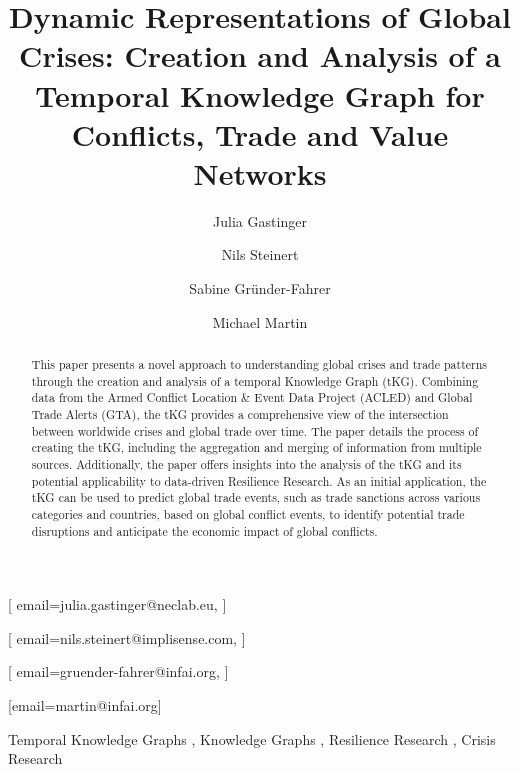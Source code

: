 \documentclass[
]{ceurart}
\begin{document}


\title{Dynamic Representations of Global Crises: Creation and Analysis of a Temporal Knowledge Graph for Conflicts, Trade and Value Networks}

\author[1,2]{Julia Gastinger}[
email=julia.gastinger@neclab.eu,
]
\cormark[1]
\address[1]{NEC Laboratories Europe GmbH, Kurfuersten-Anlage 36, 69115 Heidelberg, Germany}
\address[2]{University of Mannheim, Data and Web Science Group, B 6, 26, 68159 Mannheim, Germany}

\author[3]{Nils Steinert}[
email=nils.steinert@implisense.com,
]
\address[3]{Implisense GmbH, Spiekermannstraße 31a, 13189 Berlin, Germany}

\author[4]{Sabine Gründer-Fahrer}[
email=gruender-fahrer@infai.org,
]
\author[4]{Michael Martin}[email=martin@infai.org]
\address[4]{Institute for Applied Informatics (InfAI), Goerdelerring 9, 04109 Leipzig, Germany}


\begin{abstract}
This paper presents a novel approach to understanding global crises and trade patterns through the creation and analysis of a temporal Knowledge Graph (tKG). Combining data from the Armed Conflict Location \& Event Data Project (ACLED) and Global Trade Alerts (GTA), the tKG provides a comprehensive view of the intersection between worldwide crises and global trade over time. The paper details the process of creating the tKG, including the aggregation and merging of information from multiple sources. 
Additionally, the paper offers insights into the analysis of the tKG and its potential applicability to data-driven Resilience Research. As an initial application, the tKG can be used to predict global trade events, such as trade sanctions across various categories and countries, based on global conflict events, to identify potential trade disruptions and anticipate the economic impact of global conflicts.
\end{abstract}

\begin{keywords}
  Temporal Knowledge Graphs \sep
  Knowledge Graphs \sep
  Resilience Research \sep
  Crisis Research
\end{keywords}
\end{document}

